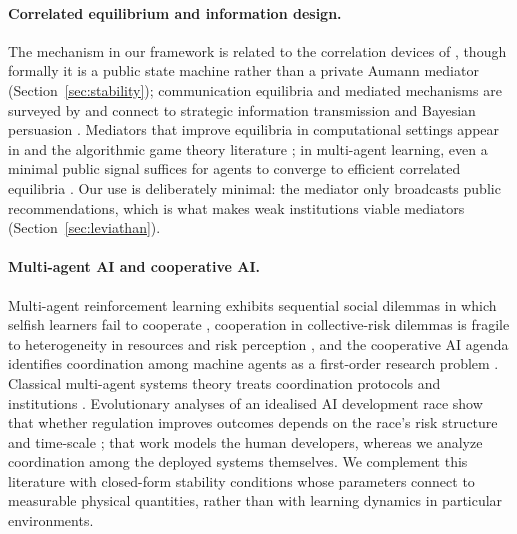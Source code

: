 \documentclass[manuscript,screen,review]{jair}
\begin{document}
\paragraph{Correlated equilibrium and information design.}
The mechanism in our framework is related to the correlation devices of \citet{aumann.1974,aumann.1987}, though formally it is a public state machine rather than a private Aumann mediator (Section~\ref{sec:stability}); communication equilibria and mediated mechanisms are surveyed by \citet{forges.1986} and connect to strategic information transmission \cite{crawford.1982} and Bayesian persuasion \cite{kamenica.gentzkow.2011,bergemann.morris.2016}. Mediators that improve equilibria in computational settings appear in \citet{ashlagi.monderer.tennenholtz.2008} and the algorithmic game theory literature \cite{nisan.2007}; in multi-agent learning, even a minimal public signal suffices for agents to converge to efficient correlated equilibria \cite{cigler.2013}. Our use is deliberately minimal: the mediator only broadcasts public recommendations, which is what makes weak institutions viable mediators (Section~\ref{sec:leviathan}).

\paragraph{Multi-agent AI and cooperative AI.}
Multi-agent reinforcement learning exhibits sequential social dilemmas in which selfish learners fail to cooperate \cite{leibo.2017,leibo.2019}, cooperation in collective-risk dilemmas is fragile to heterogeneity in resources and risk perception \cite{merhej.2022}, and the cooperative AI agenda identifies coordination among machine agents as a first-order research problem \cite{dafoe.2020,cooperative_ai.2021,critch.krueger.2020,critch.russell.2023}. Classical multi-agent systems theory treats coordination protocols and institutions \cite{shoham.2009,castelfranchi.2000}. Evolutionary analyses of an idealised AI development race show that whether regulation improves outcomes depends on the race's risk structure and time-scale \cite{han.2020}; that work models the human developers, whereas we analyze coordination among the deployed systems themselves. We complement this literature with closed-form stability conditions whose parameters connect to measurable physical quantities, rather than with learning dynamics in particular environments.
\end{document}

